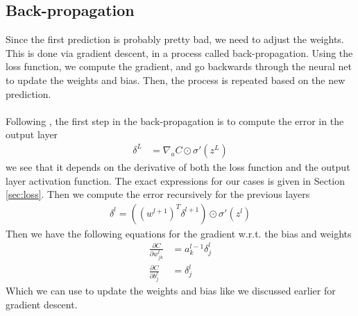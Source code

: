 \documentclass[a4paper]{article}
\begin{document}
\subsection{Back-propagation}\label{sec:backprop}
Since the first prediction is probably pretty bad, we need to adjust the weights. This is done via gradient descent, in a process called back-propagation. Using the loss function, we compute the gradient, and go backwards through the neural net to update the weights and bias. Then, the process is repeated based on the new prediction.
\\\\
Following \cite{Nielsen}, the first step in the back-propagation is to compute the error in the output layer
\begin{align*}
	\delta^L &= \nabla_a C\odot\sigma'(z^L)
\end{align*}
we see that it depends on the derivative of both the loss function and the output layer activation function. The exact expressions for our cases is given in Section \ref{sec:loss}. Then we compute the error recursively for the previous layers
\begin{align*}
\delta^l = ((w^{l+1})^T \delta^{l+1}) \odot \sigma'(z^l)
\end{align*}
Then we have the following equations for the gradient w.r.t. the bias and weights
\begin{align*}
	\frac{\partial C}{\partial w^l_{jk}} &= a^{l-1}_k \delta^l_j\\
	\frac{\partial C}{\partial b^l_j} &= \delta^l_j
\end{align*}
Which we can use to update the weights and bias like we discussed earlier for gradient descent.
\end{document}
